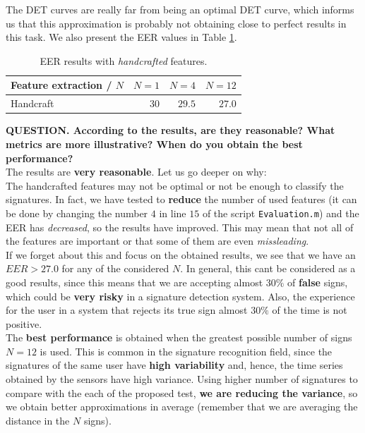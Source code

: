 \documentclass[a4paper]{article}
\def\inline{\lstinline[basicstyle=\ttfamily,keywordstyle={}]}
\begin{document}
{The DET curves are really far from being an optimal DET curve, which informs us that this approximation is probably not obtaining close to perfect results in this task. We also present the EER values in Table \ref{table:res:HAND}.

\begin{table}[H]
  \centering
\begin{tabular}{l|rrr}
Feature extraction / $N$ & $N = 1$ & $N=4$  & $N = 12$ \\ \hline
Handcraft                & $30$    & $29.5$ & $27.0$  
\end{tabular}
\caption{EER results with \emph{handcrafted} features.}
\label{table:res:HAND}
\end{table}

\textbf{QUESTION. According to the results, are they reasonable? What metrics are more illustrative? When do you obtain the best performance?}\\

The results are \textbf{very reasonable}. Let us go deeper on why: \\

The handcrafted features may not be optimal or not be enough to classify the signatures. In fact, we have tested to \textbf{reduce} the number of used features (it can be done by changing the number \(4\) in line \(15\) of the script \inline{Evaluation.m}) and the EER has \emph{decreased}, so the results have improved. This may mean that not all of the features are important or that some of them are even \emph{missleading}.\\

If we forget about this and focus on the obtained results, we see that we have an \(EER > 27.0\) for any of the considered \(N\). In general, this cant be considered as a good results, since this means that we are accepting almost \(30\%\) of \textbf{false} signs, which could be \textbf{very risky} in a signature detection system. Also, the experience for the user in a system that rejects its true sign almost \(30\%\) of the time is not positive.\\

The \textbf{best performance} is obtained when the greatest possible number of signs \(N=12\) is used. This is common in the signature recognition field, since the signatures of the same user have \textbf{high variability} and, hence, the time series obtained by the sensors have high variance. Using higher number of signatures to compare with the each of the proposed test, \textbf{we are reducing the variance}, so we obtain better approximations in average (remember that we are averaging the distance in the \(N\) signs).

}
\end{document}
